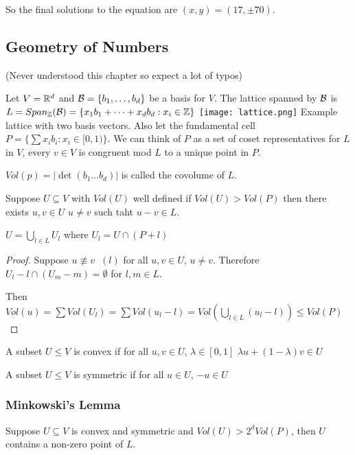 \documentclass[11pt]{article}
\begin{document}
So the final solutions to the equation are $(x,y) = (17,\pm 70).$

\subsection{Geometry of Numbers}
(Never understood this chapter so expect a lot of typos)

Let $V = \mathbb{R} ^d$ and $\mathcal{B} = \{ b_1,\dots,b_d\}$ be a basis for $V$. The lattice spanned by $\mathcal{B}$ is $L = Span_{\mathbb{Z}}(\mathcal{B})  = \{x_1b_1 + \dots + x_db_d: x_i \in \mathbb{Z} \}$ 
\spac
	\texttt{[image: lattice.png]} Example lattice with two basis vectors.
\spac
Also let the fundamental cell $P = \{\sum x_ib_i : x_i \in [0,1)\}$.
We can think of $P$ as a set of coset representatives for $L$ in $V$, every $v \in V$ is congruent mod $L$ to a unique point in $P$.

\spa
$Vol(p) = |\det(b_1 \dots b_d)|$ is called the covolume of $L$.


\begin{lemma}
	Suppose $U \subseteq V$ with $Vol(U)$ well defined if $Vol(U) > Vol(P)$ then there exists $u,v \in U$ $u \neq v$ such taht $u - v \in L$.
\end{lemma}

$U = \bigcup_{l \in L} U_l$ where $U_l = U \cap(P+l)$


\begin{proof}
	Suppose $u \not \equiv v \hspace{7pt} (l)$ for all $u,v \in U$, $u \neq v$. Therefore $U_l - l \cap (U_m - m) = \emptyset$ for $l,m \in L$.

	Then $Vol(u) = \sum Vol(U_l) = \sum Vol(u_l -l) = Vol(\bigcup_{l \in L}(u_l - l) )  \leq Vol(P)$ \lightning
\end{proof}

\begin{defn}
	A subset $U \leq V$ is convex if for all $u,v \in U$, $\lambda \in [0,1]$ $\lambda u + (1-\lambda) v \in U$
\end{defn}


\begin{defn}
A subset $U \leq V$ is symmetric if for all $ u \in U$, $-u \in U$
\end{defn}


\subsubsection{Minkowski's Lemma}
\begin{lemma}

Suppose $U \subseteq V$ is convex and symmetric and $Vol(U) > 2^d Vol(P)$, then $U$ contains a non-zero point of $L$.
\end{lemma}
\end{document}
